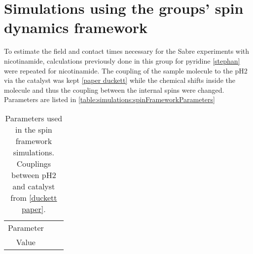     \section{Simulations using the groups' spin dynamics framework}
        To estimate the field and contact times necessary for the Sabre experiments with nicotinamide, calculations previously done in this group for pyridine \ref{stephan} were repeated for nicotinamide. The coupling of the sample molecule to the pH2 via the catalyst was kept \ref{paper duckett} while the chemical shifts inside the molecule and thus the coupling between the internal spins were changed. Parameters are listed in \ref{table:simulations:spinFrameworkParameters}
        \begin{table}
        \centering
            \begin{tabular}{ccc}
                Parameter & \\
                Value & 
            \end{tabular}
            \caption[Spin framework parameters]{Parameters used in the spin framework simulations. Couplings between pH2 and catalyst from \ref{duckett paper}. }
        \end{table}
